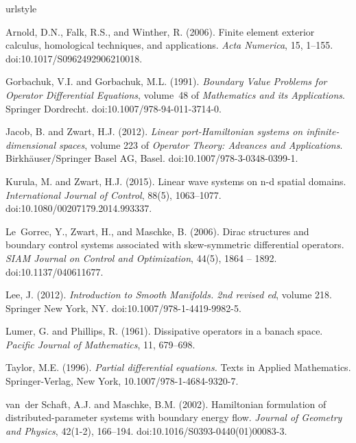 \documentclass{ifacconf}
\begin{document}
\begin{thebibliography}{9}
\providecommand{\natexlab}[1]{#1}
\providecommand{\url}[1]{\texttt{#1}}
\providecommand{\urlprefix}{URL }
\expandafter\ifx\csname urlstyle\endcsname\relax
  \providecommand{\doi}[1]{doi:\discretionary{}{}{}#1}\else
  \providecommand{\doi}{doi:\discretionary{}{}{}\begingroup
  \urlstyle{rm}\Url}\fi

Arnold, D.N., Falk, R.S., and Winther, R. (2006).
\newblock Finite element exterior calculus, homological techniques, and
  applications.
\newblock \emph{Acta Numerica}, 15, 1--155.
\newblock \doi{10.1017/S0962492906210018}.

Gorbachuk, V.I. and Gorbachuk, M.L. (1991).
\newblock \emph{Boundary Value Problems for Operator Differential Equations},
  volume~48 of \emph{Mathematics and its Applications}.
\newblock Springer Dordrecht.
\newblock \doi{10.1007/978-94-011-3714-0}.

Jacob, B. and Zwart, H.J. (2012).
\newblock \emph{Linear port-{H}amiltonian systems on infinite-dimensional
  spaces}, volume 223 of \emph{Operator Theory: Advances and Applications}.
\newblock Birkh\"{a}user/Springer Basel AG, Basel.
\newblock \doi{10.1007/978-3-0348-0399-1}.

Kurula, M. and Zwart, H.J. (2015).
\newblock Linear wave systems on n-d spatial domains.
\newblock \emph{International Journal of Control}, 88(5), 1063--1077.
\newblock \doi{10.1080/00207179.2014.993337}.

Le~Gorrec, Y., Zwart, H., and Maschke, B. (2006).
\newblock Dirac structures and boundary control systems associated with
  skew-symmetric differential operators.
\newblock \emph{SIAM Journal on Control and Optimization}, 44(5), 1864 –
  1892.
\newblock \doi{10.1137/040611677}.

Lee, J. (2012).
\newblock \emph{Introduction to Smooth Manifolds. 2nd revised ed}, volume 218.
\newblock Springer New York, NY.
\newblock \doi{10.1007/978-1-4419-9982-5}.

Lumer, G. and Phillips, R. (1961).
\newblock Dissipative operators in a banach space.
\newblock \emph{Pacific Journal of Mathematics}, 11, 679--698.

Taylor, M.E. (1996).
\newblock \emph{Partial differential equations.}
\newblock Texts in Applied Mathematics. Springer-Verlag, New York,
  10.1007/978-1-4684-9320-7.

van~der Schaft, A.J. and Maschke, B.M. (2002).
\newblock Hamiltonian formulation of distributed-parameter systems with
  boundary energy flow.
\newblock \emph{Journal of Geometry and Physics}, 42(1-2), 166--194.
\newblock \doi{10.1016/S0393-0440(01)00083-3}.

\end{thebibliography}
\end{document}
